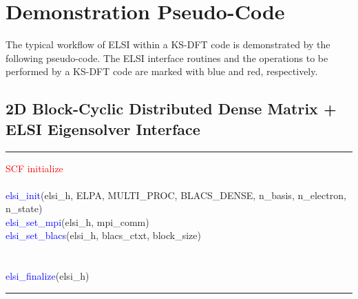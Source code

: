 \documentclass{report}
\begin{document}
\section{Demonstration Pseudo-Code}
\label{sec:example}
The typical workflow of ELSI within a KS-DFT code is demonstrated by the following pseudo-code.  The ELSI interface routines and the operations to be performed by a KS-DFT code are marked with blue and red, respectively.\\

\subsection{2D Block-Cyclic Distributed Dense Matrix + ELSI Eigensolver Interface}
\label{subsec:example_ev_blacs}
\noindent\rule{18cm}{0.4pt}
\bigskip

\begin{algorithm}[H]
\textcolor{red}{SCF initialize}\\
\hspace{0.3cm}\\
\textcolor{blue}{elsi\_init}(elsi\_h, ELPA, MULTI\_PROC, BLACS\_DENSE, n\_basis, n\_electron, n\_state)\\
\textcolor{blue}{elsi\_set\_mpi}(elsi\_h, mpi\_comm)\\
\textcolor{blue}{elsi\_set\_blacs}(elsi\_h, blacs\_ctxt, block\_size)\\
\hspace{0.3cm}\\
\hspace{0.3cm}\\
\textcolor{blue}{elsi\_finalize}(elsi\_h)\\
\end{algorithm}

\bigskip
\noindent\rule{18cm}{0.4pt}
\end{document}
